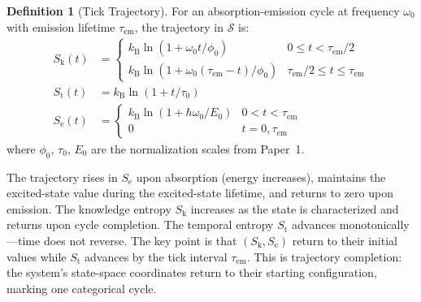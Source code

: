 \documentclass[11pt,twocolumn,a4paper]{article}
\theoremstyle{definition}
\newtheorem{definition}[theorem]{Definition}
\theoremstyle{remark}
\newcommand{\kB}{k_{\mathrm{B}}}
\newcommand{\Sk}{S_{\mathrm{k}}}
\newcommand{\St}{S_{\mathrm{t}}}
\newcommand{\Se}{S_{\mathrm{e}}}
\newcommand{\Sspace}{\mathcal{S}}
\newcommand{\tem}{\tau_{\mathrm{em}}}
\begin{document}
\begin{definition}[Tick Trajectory]
\label{def:tick_trajectory}
For an absorption-emission cycle at frequency $\omega_0$ with emission lifetime $\tem$, the trajectory in $\Sspace$ is:
\begin{align}
\Sk(t) &= \begin{cases} \kB \ln(1 + \omega_0 t / \phi_0) & 0 \leq t < \tem/2 \\ \kB \ln(1 + \omega_0 (\tem - t)/\phi_0) & \tem/2 \leq t \leq \tem \end{cases} \label{eq:sk_trajectory} \\
\St(t) &= \kB \ln(1 + t/\tau_0) \label{eq:st_trajectory} \\
\Se(t) &= \begin{cases} \kB \ln(1 + \hbar\omega_0/E_0) & 0 < t < \tem \\ 0 & t = 0, \tem \end{cases} \label{eq:se_trajectory}
\end{align}
where $\phi_0$, $\tau_0$, $E_0$ are the normalization scales from Paper~1.
\end{definition}

The trajectory rises in $\Se$ upon absorption (energy increases), maintains the excited-state value during the excited-state lifetime, and returns to zero upon emission. The knowledge entropy $\Sk$ increases as the state is characterized and returns upon cycle completion. The temporal entropy $\St$ advances monotonically---time does not reverse. The key point is that $(\Sk, \Se)$ return to their initial values while $\St$ advances by the tick interval $\tem$. This is trajectory completion: the system's state-space coordinates return to their starting configuration, marking one categorical cycle.
\end{document}
